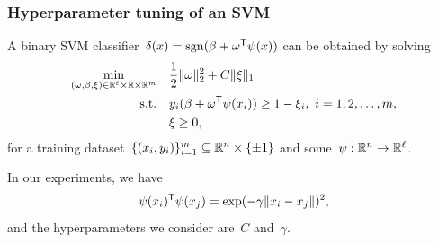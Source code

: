 \documentclass{polyu-presentation}
\begin{document}
\begin{frame}
    \frametitle{Hyperparameter tuning of an SVM}

    A \alert{binary SVM} classifier~$\delta(x) = \operatorname{sgn}(\beta + \omega^{\mathsf{T}} \psi(x))$ can be obtained by solving
    \begin{align*}
        \min_{(\omega, \beta, \xi) \in \mathbb{R}^{\ell} \times \mathbb{R} \times \mathbb{R}^m} & \quad\frac{1}{2} \lVert\omega\rVert_2^2 + C \lVert\xi\rVert_1\\
        \text{s.t.}                                                     & \quad y_i (\beta + \omega^{\mathsf{T}} \psi(x_i)) \ge 1 - \xi_i, ~ i = 1, 2, \dots, m,\\
                                                                        & \quad \xi \ge 0,
    \end{align*}
    for a \alert{training dataset}~$\{(x_i, y_i)\}_{i = 1}^m \subseteq \mathbb{R}^n \times \{\pm 1\}$ and some~$\psi : \mathbb{R}^n \to \mathbb{R}^{\ell}$.
    
    \medskip

    \begin{block}{}
        In our experiments, we have
        \begin{equation*}
            \psi(x_i)^{\mathsf{T}} \psi(x_j) = \exp(-\gamma \lVert x_i - x_j\rVert)^2,
        \end{equation*}
        and the \alert{hyperparameters} we consider are~$C$ and~$\gamma$.
    \end{block}
\end{frame}
\end{document}
